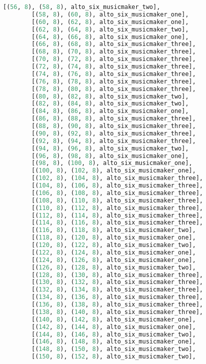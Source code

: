 \begin{lstlisting}[language=Python, caption=Invocation Source Code]
        [(56, 8), (58, 8), alto_six_musicmaker_two],
        [(58, 8), (60, 8), alto_six_musicmaker_one],
        [(60, 8), (62, 8), alto_six_musicmaker_one],
        [(62, 8), (64, 8), alto_six_musicmaker_two],
        [(64, 8), (66, 8), alto_six_musicmaker_one],
        [(66, 8), (68, 8), alto_six_musicmaker_three],
        [(68, 8), (70, 8), alto_six_musicmaker_three],
        [(70, 8), (72, 8), alto_six_musicmaker_three],
        [(72, 8), (74, 8), alto_six_musicmaker_three],
        [(74, 8), (76, 8), alto_six_musicmaker_three],
        [(76, 8), (78, 8), alto_six_musicmaker_three],
        [(78, 8), (80, 8), alto_six_musicmaker_three],
        [(80, 8), (82, 8), alto_six_musicmaker_two],
        [(82, 8), (84, 8), alto_six_musicmaker_two],
        [(84, 8), (86, 8), alto_six_musicmaker_one],
        [(86, 8), (88, 8), alto_six_musicmaker_three],
        [(88, 8), (90, 8), alto_six_musicmaker_three],
        [(90, 8), (92, 8), alto_six_musicmaker_three],
        [(92, 8), (94, 8), alto_six_musicmaker_three],
        [(94, 8), (96, 8), alto_six_musicmaker_two],
        [(96, 8), (98, 8), alto_six_musicmaker_one],
        [(98, 8), (100, 8), alto_six_musicmaker_one],
        [(100, 8), (102, 8), alto_six_musicmaker_one],
        [(102, 8), (104, 8), alto_six_musicmaker_three],
        [(104, 8), (106, 8), alto_six_musicmaker_three],
        [(106, 8), (108, 8), alto_six_musicmaker_three],
        [(108, 8), (110, 8), alto_six_musicmaker_three],
        [(110, 8), (112, 8), alto_six_musicmaker_three],
        [(112, 8), (114, 8), alto_six_musicmaker_three],
        [(114, 8), (116, 8), alto_six_musicmaker_three],
        [(116, 8), (118, 8), alto_six_musicmaker_two],
        [(118, 8), (120, 8), alto_six_musicmaker_one],
        [(120, 8), (122, 8), alto_six_musicmaker_two],
        [(122, 8), (124, 8), alto_six_musicmaker_one],
        [(124, 8), (126, 8), alto_six_musicmaker_one],
        [(126, 8), (128, 8), alto_six_musicmaker_two],
        [(128, 8), (130, 8), alto_six_musicmaker_three],
        [(130, 8), (132, 8), alto_six_musicmaker_three],
        [(132, 8), (134, 8), alto_six_musicmaker_three],
        [(134, 8), (136, 8), alto_six_musicmaker_three],
        [(136, 8), (138, 8), alto_six_musicmaker_three],
        [(138, 8), (140, 8), alto_six_musicmaker_three],
        [(140, 8), (142, 8), alto_six_musicmaker_one],
        [(142, 8), (144, 8), alto_six_musicmaker_one],
        [(144, 8), (146, 8), alto_six_musicmaker_two],
        [(146, 8), (148, 8), alto_six_musicmaker_one],
        [(148, 8), (150, 8), alto_six_musicmaker_two],
        [(150, 8), (152, 8), alto_six_musicmaker_two],

\end{lstlisting}
